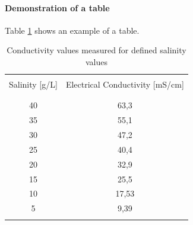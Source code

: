 \paragraph{Demonstration of a table}
Table \ref{tbl:Salinity-EC} shows an example of a table.

\begin{table}
	\begin{center}
		\caption{\label{tbl:Salinity-EC}Conductivity values measured for defined salinity values}
		\begin{tabular}{cc}
			\hline \\
			Salinity [g/L]	& 	Electrical Conductivity [mS/cm]\\    
			\\
			\hline \\
			40	&	63,3	\\
			35	&	55,1	\\
			30	&	47,2	\\
			25	&	40,4	\\
			20	&	32,9	\\
			15	&	25,5	\\
			10	&	17,53	\\
			5	&	9,39	\\
			\hline \\
		\end{tabular}  
	\end{center}
\end{table}

